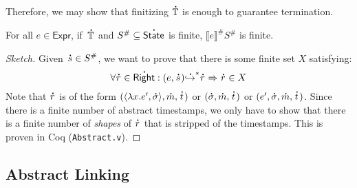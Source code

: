 \documentclass[acmsmall,screen,review]{acmart}\settopmatter{printfolios=true,printccs=false,printacmref=false}
\theoremstyle{acmdefinition}
\newcommand*{\A}[1]{\overset{\,_{\mbox{\Large .}}}{#1}}
\newcommand*{\Abs}[1]{{#1}^{\#}}
\newcommand*{\Expr}{\mathsf{Expr}}
\newcommand*{\Time}{\mathbb{T}}
\newcommand*{\ctx}{\sigma}
\newcommand*{\mem}{m}
\newcommand*{\Right}{\mathsf{Right}}
\newcommand*{\rightst}{r}
\newcommand*{\State}{\mathsf{State}}
\newcommand*{\semarrow}{\hookrightarrow}
\newcommand*{\sembracket}[1]{\lBrack{#1}\rBrack}
\begin{document}
Therefore, we may show that finitizing $\A\Time$ is enough to guarantee termination.
\begin{theorem}[Finiteness]\label{thm:absfinite}
  For all $e\in\Expr$, if $\:\A\Time$ and $\Abs{S}\subseteq\A\State$ is finite, $\Abs{\sembracket{e}}\Abs{S}$ is finite.
\end{theorem}
\begin{proof}[Sketch]
  Given $\A{s}\in\Abs{S}$, we want to prove that there is some finite set $X$ satisfying:
  \[\forall \A\rightst\in\A\Right:(e,\A{s}){\A\semarrow}^*\A\rightst\Rightarrow\A\rightst\in X\]
  Note that $\A\rightst$ is of the form $(\langle\lambda x.e',\A{\ctx}\rangle,\A\mem,\A{t})$ or $(\A{\ctx},\A\mem,\A{t})$ or $(e',\A{\ctx},\A\mem,\A{t})$.
  Since there is a finite number of abstract timestamps, we only have to show that there is a finite number of \emph{shapes} of $\A\rightst$ that is stripped of the timestamps.
  This is proven in Coq (\texttt{Abstract.v}).
\end{proof}
\subsection{Abstract Linking}
\end{document}
